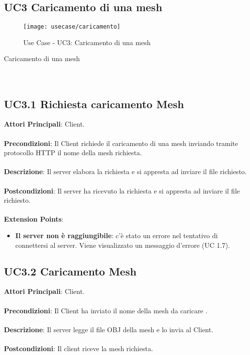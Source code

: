 
\subsection{UC3 Caricamento di una mesh}
\begin{figure}[!h] 
    \centering 
    \texttt{[image: usecase/caricamento]} 
    \caption{Use Case - UC3: Caricamento di una mesh}
\end{figure}

\begin{usecase}{3}{Caricamento di una mesh}
\\ 
\\ 
\\ 
\label{uc:caricamento}
\end{usecase}

\subsection{UC3.1 Richiesta caricamento Mesh}
\textbf{Attori Principali}: Client.
\\\\ \textbf{Precondizioni}: Il Client richiede il caricamento di una mesh inviando tramite protocollo HTTP il nome della mesh richiesta.
\\\\ \textbf{Descrizione}: Il server elabora la richiesta e si appresta ad inviare il file richiesto.
\\\\ \textbf{Postcondizioni}: Il server ha ricevuto la richiesta e si appresta ad inviare il file richiesto.
\\\\ \textbf{Extension Points}:
\begin{itemize}
\item \textbf{Il server non è raggiungibile}: c'è stato un errore nel tentativo di connettersi al server. Viene visualizzato un messaggio d'errore (UC 1.7).
\end{itemize}

\subsection{UC3.2 Caricamento Mesh}
\textbf{Attori Principali}: Client.
\\\\ \textbf{Precondizioni}: Il Client ha inviato il nome della mesh da caricare .
\\\\ \textbf{Descrizione}: Il server legge il file OBJ della mesh e lo invia al Client.
\\\\ \textbf{Postcondizioni}: Il client riceve la mesh richiesta.

